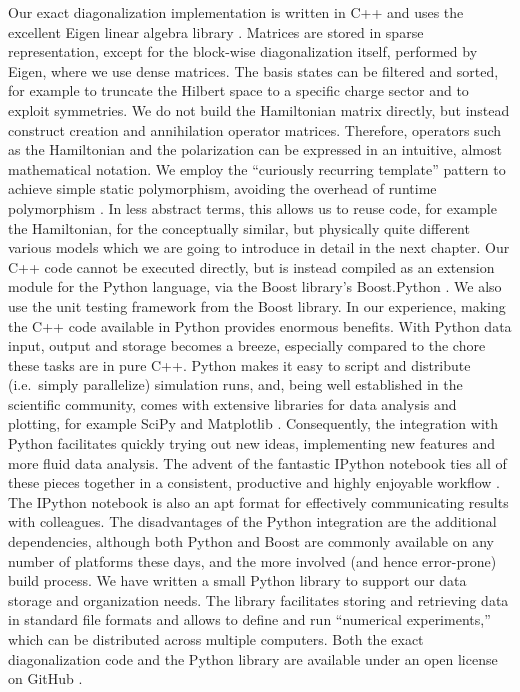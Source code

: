 Our  exact diagonalization implementation is written in C++ and uses
the excellent Eigen linear algebra library \cite{eigen}. Matrices are stored in
sparse representation, except for the block-wise diagonalization itself,
performed by Eigen, where we use dense matrices. The basis states can be
filtered and sorted, for example to truncate the Hilbert space to a specific
charge sector and to exploit symmetries. We do not build the Hamiltonian matrix
directly, but instead construct creation and annihilation operator matrices.
Therefore, operators such as the Hamiltonian and the polarization can be
expressed in an intuitive, almost mathematical notation. We employ the
``curiously recurring template'' pattern to achieve simple static polymorphism,
avoiding the overhead of runtime polymorphism \cite{andrei2001modern}. In less
abstract terms, this allows us to reuse code, for example the Hamiltonian, for
the conceptually similar, but physically quite different various 
models which we are going to introduce in detail in the next chapter. Our C++
code cannot be executed directly, but is instead compiled as an extension module
for the Python language, via the Boost library's Boost.Python \cite{boost}. We
also use the unit testing framework from the Boost library. In our experience,
making the C++ code available in Python provides enormous benefits. With Python
data input, output and storage becomes a breeze, especially compared to the
chore these tasks are in pure C++. Python makes it easy to script and distribute
(i.e.\ simply parallelize) simulation runs, and, being well established in the
scientific community, comes with extensive libraries for data analysis and
plotting, for example SciPy and Matplotlib \cite{scipy, hunter2007matplotlib}.
Consequently, the integration with Python facilitates quickly trying out new
ideas, implementing new features and more fluid data analysis. The advent of the
fantastic IPython notebook ties all of these pieces together in a consistent,
productive and highly enjoyable workflow \cite{perez2007ipython}. The IPython
notebook is also an apt format for effectively communicating results with
colleagues. The disadvantages of the Python integration are the additional
dependencies, although both Python and Boost are commonly available on any
number of platforms these days, and the more involved (and hence error-prone)
build process. We have written a small Python library to support our data
storage and organization needs. The library facilitates storing and retrieving
data in standard file formats and allows to define and run ``numerical
experiments,'' which can be distributed across multiple computers. Both the
 exact diagonalization code and the Python library are available under
an open license on GitHub \cite{githubqca, githubcoma}.
